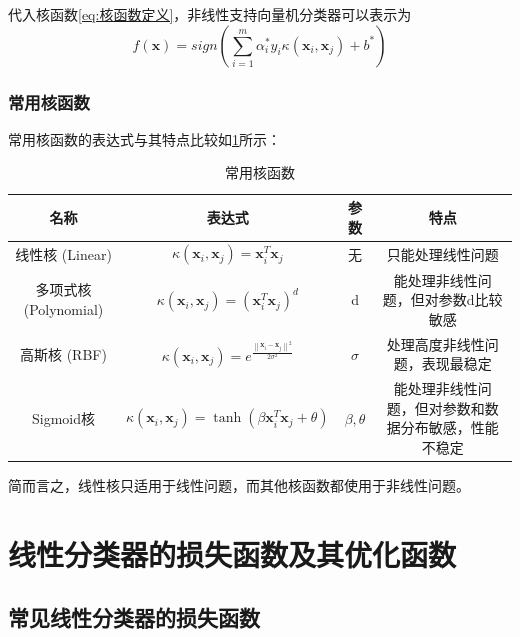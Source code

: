 \documentclass[withoutpreface,bwprint]{NoteBook}
\begin{document}
代入核函数\cref{eq:核函数定义}，非线性支持向量机分类器可以表示为
\begin{equation}
    \label{eq:非线性支持向量机的分类器代入核函数}
    f(\mathbf{x}) = sign \left( \sum_{i=1}^{m} \alpha_i^* y_i \kappa (\mathbf{x}_i,\mathbf{x}_j) + b^* \right)
\end{equation}

\subsubsection{常用核函数}
常用核函数的表达式与其特点比较如\cref{tab:常用核函数}所示：
\begin{table}[!htbp]
    \caption{常用核函数}\label{tab:常用核函数} \centering
    \begin{tabular}{cccc} %
        \toprule[1.5pt] %
        名称 & 表达式 & 参数 & 特点 \\
        \midrule[1pt] %
        线性核 (Linear)       & $ \kappa(\mathbf{x}_i, \mathbf{x}_j) = \mathbf{x}_i^T \mathbf{x}_j $ & 无 & 只能处理线性问题\\
        多项式核 (Polynomial) & $ \kappa(\mathbf{x}_i, \mathbf{x}_j) = (\mathbf{x}_i^T \mathbf{x}_j)^d $ & d & 能处理非线性问题，但对参数d比较敏感 \\
        高斯核 (RBF)          & $ \kappa(\mathbf{x}_i, \mathbf{x}_j) = e^{\frac{\left\| \mathbf{x}_i - \mathbf{x}_j \right\|^2}{2 \sigma^2}} $  & $\sigma$ & 处理高度非线性问题，表现最稳定\\
        Sigmoid核             & $ \kappa(\mathbf{x}_i, \mathbf{x}_j) = \tanh (\beta \mathbf{x}_i^T \mathbf{x}_j + \theta)$ & $\beta, \theta $ & {能处理非线性问题，但对参数和数据分布敏感，性能不稳定} \\ 
        \bottomrule[1.5pt] %
    \end{tabular}
\end{table}

简而言之，线性核只适用于线性问题，而其他核函数都使用于非线性问题。

\section{线性分类器的损失函数及其优化函数}
\subsection{常见线性分类器的损失函数}
\end{document}
